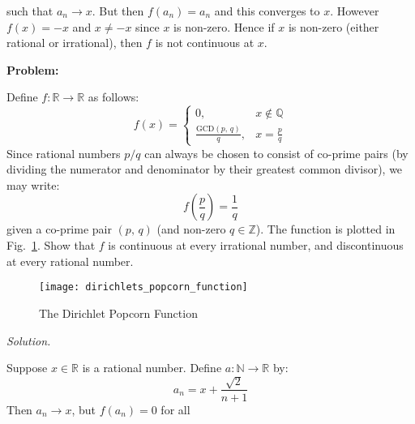\documentclass{article}
\theoremstyle{normal}
\newif\ifsolution
\begin{document}
            such that $a_{n}\rightarrow{x}$. But then
            $f(a_{n})=a_{n}$ and this converges to $x$. However
            $f(x)=-x$ and $x\ne{-x}$ since $x$ is non-zero. Hence if
            $x$ is non-zero (either rational or irrational), then $f$ is
            not continuous at $x$.
            \par\hfill\par
            \color{black}
        \fi
        \textbf{Problem:}
        \par\hfill\par
        Define $f:\mathbb{R}\rightarrow\mathbb{R}$ as follows:
        \begin{equation}
            f(x)
            =\begin{cases}
                0,&x\not\in\mathbb{Q}\\
                \frac{\textrm{GCD}(p,\,q)}{q},&x=\frac{p}{q}
            \end{cases}
        \end{equation}
        Since rational numbers $p/q$ can always be chosen to consist of
        co-prime pairs (by dividing the numerator and denominator by their
        greatest common divisor), we may write:
        \begin{equation}
            f\left(\frac{p}{q}\right)
            =\frac{1}{q}
        \end{equation}
        given a co-prime pair $(p,\,q)$ (and non-zero $q\in\mathbb{Z}$).
        The function is plotted in Fig.~\ref{fig:popcorn}.
        Show that $f$ is continuous at every irrational number, and
        discontinuous at every rational number.
        \begin{figure}
            \centering
            \texttt{[image: dirichlets\_popcorn\_function]}
            \caption{The Dirichlet Popcorn Function}
            \label{fig:popcorn}
        \end{figure}
        \par\hfill\par
        \ifsolution
            \color{blue}
            \textit{Solution.}
            \par\hfill\par
            Suppose $x\in\mathbb{R}$ is a rational number.
            Define $a:\mathbb{N}\rightarrow\mathbb{R}$ by:
            \begin{equation}
                a_{n}=x+\frac{\sqrt{2}}{n+1}
            \end{equation}
            Then $a_{n}\rightarrow{x}$, but $f(a_{n})=0$ for all
\end{document}
